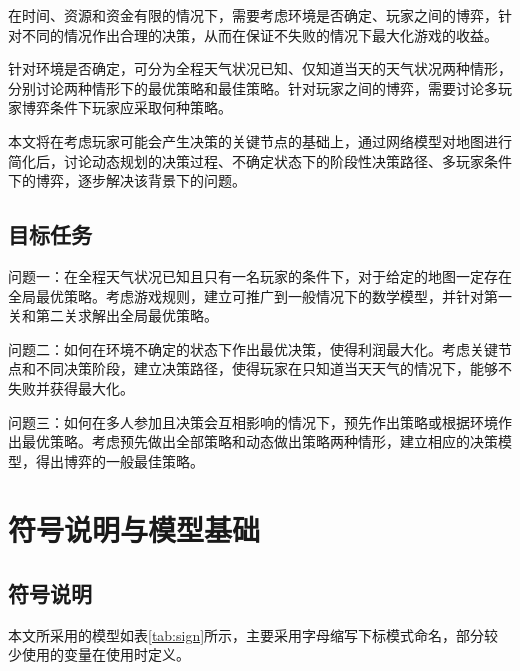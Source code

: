 \documentclass[bwprint]{cumcmthesis} %
\begin{document}
在时间、资源和资金有限的情况下，需要考虑环境是否确定、玩家之间的博弈，针对不同的情况作出合理的决策，从而在保证不失败的情况下最大化游戏的收益。

针对环境是否确定，可分为全程天气状况已知、仅知道当天的天气状况两种情形，分别讨论两种情形下的最优策略和最佳策略。针对玩家之间的博弈，需要讨论多玩家博弈条件下玩家应采取何种策略。

本文将在考虑玩家可能会产生决策的关键节点的基础上，通过网络模型对地图进行简化后，讨论动态规划的决策过程、不确定状态下的阶段性决策路径、多玩家条件下的博弈，逐步解决该背景下的问题。

\subsection{目标任务}

问题一：在全程天气状况已知且只有一名玩家的条件下，对于给定的地图一定存在全局最优策略。考虑游戏规则，建立可推广到一般情况下的数学模型，并针对第一关和第二关求解出全局最优策略。

问题二：如何在环境不确定的状态下作出最优决策，使得利润最大化。考虑关键节点和不同决策阶段，建立决策路径，使得玩家在只知道当天天气的情况下，能够不失败并获得最大化。

问题三：如何在多人参加且决策会互相影响的情况下，预先作出策略或根据环境作出最优策略。考虑预先做出全部策略和动态做出策略两种情形，建立相应的决策模型，得出博弈的一般最佳策略。


\section{符号说明与模型基础}
\label{sec:simulate}

\subsection{符号说明}

本文所采用的模型如表\ref{tab:sign}所示，主要采用字母缩写下标模式命名，部分较少使用的变量在使用时定义。
\end{document}
